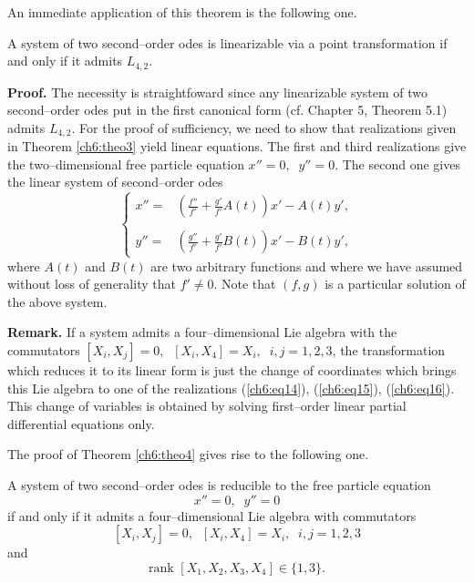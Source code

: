 An immediate application of this theorem is the following one.
\begin{theo}
\label{ch6:theo4}
\begin{em}
A system of two second--order odes is linearizable via a point transformation
if and only if it admits $L_{4,2}$.
\end{em}
\end{theo}
{\bf Proof.} The necessity is straightfoward since any linearizable 
system of two second--order odes  put in the first canonical 
form (cf. Chapter 5, Theorem 5.1) admits $L_{4,2}$. For the proof of sufficiency, we need
to show that realizations given in Theorem \ref{ch6:theo3} yield linear equations.
The first and third realizations give the two--dimensional free particle
equation $x''=0,\;\;y''=0$. The second one gives the linear system of
second--order odes
\[\left \{ \begin{array}{cc}
x''= &\left (\displaystyle{\frac{f''}{f'}+\frac{g'}{f'}A(t)} \right ) x'-A(t)y',\\
  & \\
y''= &\left (\displaystyle{\frac{g''}{f'}+\frac{g'}{f'}B(t)} \right ) x'-B(t)y',
\end{array} \right.\]
where $A(t)$ and $B(t)$ are two arbitrary functions and where we have assumed
without loss of generality that $f'\ne 0$. Note that  $(f,g)$ 
is a particular solution of the above system.

{\bf Remark. }  If a system admits a four--dimensional Lie
algebra with the commutators $[X_i,X_j]=0,\;\;[X_i,X_4]=X_i,\;\;i,j=1,2,3$, 
the transformation which reduces it to its linear form
is just the change of coordinates which brings this Lie algebra to one of 
the realizations (\ref{ch6:eq14}), (\ref{ch6:eq15}), (\ref{ch6:eq16}). 
This change of variables is obtained by solving first--order 
linear partial differential equations only.

The proof of Theorem \ref{ch6:theo4} gives rise to the following one.
\begin{theo}
\label{ch6:theo5}
\begin{em}
A system of two second--order odes is reducible to the free particle equation 
\[x''=0,\;\;y''=0\] if and only if it admits a four--dimensional Lie algebra
with commutators 
\[[X_i,X_j]=0,\;\;[X_i,X_4]=X_i,\;\;i,j=1,2,3\] 
and
\[\mbox{rank }[X_1,X_2,X_3,X_4]\in \{1,3\}.\]
\end{em}
\end{theo}
